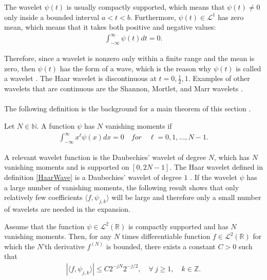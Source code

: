 The wavelet $\psi(t)$ is usually compactly supported, which means that $\psi(t) \neq 0$ only inside a bounded interval $a < t < b$. Furthermore, $\psi(t) \in \mathcal{L}^1$ has zero mean, which means that it takes both positive and negative values:
\begin{align*}
\int_{-\infty}^\infty \psi(t) dt = 0.
\end{align*}

Therefore, since a wavelet is nonzero only within a finite range and the mean is zero, then $\psi(t)$ has the form of a wave, which is the reason why $\psi(t)$ is called a wavelet \cite{page 411, Wang}. The Haar wavelet is discontinuous at $t = 0, \frac{1}{2}, 1$. Examples of other wavelets that are continuous are the Shannon, Mortlet, and Marr wavelets \cite{page 417-420, Wang}.
\\ \\
The following definition is the background for a main theorem of this section \cite{page 170, FSE2010}.

\begin{definition}
Let $N \in \mathbb{N}$. A function $\psi$ has $N$ vanishing moments if
\begin{align*}
\int_{-\infty}^\infty x^\ell \psi(x) dx = 0 \quad for \quad \ell = 0, 1, \dots, N-1.
\end{align*}
\end{definition}

A relevant wavelet function is the Daubechies' wavelet of degree $N$, which has $N$ vanishing moments and is supported on $[0,2N-1]$. The Haar wavelet defined in definition \ref{HaarWave} is a Daubechies' wavelet of degree $1$ \cite{page 174, FSE2010}. If the wavelet $\psi$ has a large number of vanishing moments, the following result shows that only relatively few coefficients $\langle f, \psi_{j,k} \rangle$ will be large and therefore only a small number of wavelets are needed in the expansion.

\begin{theorem}
Assume that the function $\psi \in \mathcal{L}^2(\mathbb{R})$ is compactly supported and has $N$ vanishing moments. Then, for any $N$ times differentiable function $f \in \mathcal{L}^2(\mathbb{R})$ for which the $N$'th derivative $f^{(N)}$ is bounded, there exists a constant $C > 0$ such that
\begin{align} \label{eq:decay_wave_coeff}
|\langle f, \psi_{j,k} \rangle| \leq C 2^{-jN} 2^{-j/2}, \quad \forall \ j \geq 1, \quad k \in \mathbb{Z}.
\end{align}
\end{theorem}


